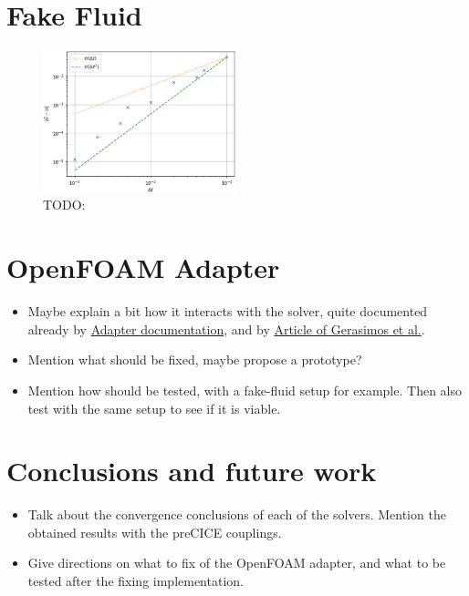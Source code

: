 \documentclass[
  english,        %
  font=times,     %
  onecolumn,      %
]{tumarticle}
\begin{document}
\section{Fake Fluid}

\begin{figure}[!ht]
    \centering
    \includegraphics[width=0.5\textwidth]{resources/fake_fluid.png}
    \caption{TODO: }
    \label{fig:fake-fluid}
\end{figure}


\section{OpenFOAM Adapter}
\begin{itemize}
    \item Maybe explain a bit how it interacts with the solver, quite documented already by \href{https://precice.org/adapter-openfoam-extend.html}{Adapter documentation}, and by \href{https://journal.openfoam.com/index.php/ofj/article/view/88/78}{Article of Gerasimos et al.}.
    \item Mention what should be fixed, maybe propose a prototype?
    \item Mention how should be tested, with a fake-fluid setup for example. Then also test with the same setup to see if it is viable.
\end{itemize}

\section{Conclusions and future work}
\begin{itemize}
    \item Talk about the convergence conclusions of each of the solvers. Mention the obtained results with the preCICE couplings.
    \item Give directions on what to fix of the OpenFOAM adapter, and what to be tested after the fixing implementation.

\end{itemize}

\printbibliography
\end{document}
